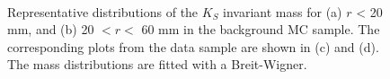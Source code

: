 \begin{figure}[!htb]
    \centering
     \\
    \caption{Representative distributions of the $K_{S}$ invariant mass for (a) $r$ < 20 mm, and (b) 20 $<r<$ 60 mm in the background MC sample. The corresponding plots from the data sample are shown in (c) and (d). The mass distributions are fitted with a Breit-Wigner.}
    \label{fig:Ks_fit}
\end{figure}


